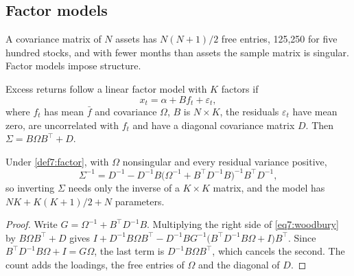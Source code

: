 \begin{chapterrefs}
\FloatBarrier
\section{Factor models}
\label{sec7:factors}

A covariance matrix of $N$ assets has $N(N+1)/2$ free entries, 125,250 for five hundred stocks, and
with fewer months than assets the sample matrix is singular. Factor models impose structure.

\begin{definition}\label{def7:factor}
Excess returns follow a linear factor model with $K$ factors if
\begin{equation}\label{eq7:factor}
  x_t=\alpha+Bf_t+\varepsilon_t ,
\end{equation}
where $f_t$ has mean $\bar f$ and covariance $\Omega$, $B$ is $N\times K$, the residuals $\varepsilon_t$
have mean zero, are uncorrelated with $f_t$ and have a diagonal covariance matrix $D$. Then
$\Sigma=B\Omega B^\top+D$.
\end{definition}

\begin{proposition}\label{prop7:woodbury}
Under \cref{def7:factor}, with $\Omega$ nonsingular and every residual variance positive,
\begin{equation}\label{eq7:woodbury}
  \Sigma^{-1}=D^{-1}-D^{-1}B\bigl(\Omega^{-1}+B^\top D^{-1}B\bigr)^{-1}B^\top D^{-1},
\end{equation}
so inverting $\Sigma$ needs only the inverse of a $K\times K$ matrix, and the model has
$NK+K(K+1)/2+N$ parameters.
\end{proposition}

\begin{proof}
Write $G=\Omega^{-1}+B^\top D^{-1}B$. Multiplying the right side of \cref{eq7:woodbury} by
$B\Omega B^\top+D$ gives
$I+D^{-1}B\Omega B^\top-D^{-1}BG^{-1}\bigl(B^\top D^{-1}B\Omega+I\bigr)B^\top$. Since
$B^\top D^{-1}B\Omega+I=G\Omega$, the last term is $D^{-1}B\Omega B^\top$, which cancels the second.
The count adds the loadings, the free entries of $\Omega$ and the diagonal of $D$.
\end{proof}


\end{chapterrefs}
